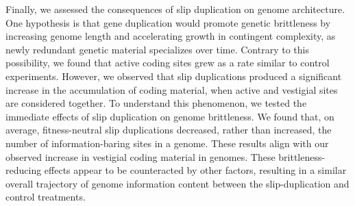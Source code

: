 Finally, we assessed the consequences of slip duplication on genome architecture.
One hypothesis is that gene duplication would promote genetic brittleness by increasing genome length and accelerating growth in contingent complexity, as newly redundant genetic material specializes over time.
Contrary to this possibility, we found that active coding sites grew as a rate similar to control experiments.
However, we observed that slip duplications produced a significant increase in the accumulation of coding material, when active and vestigial sites are considered together.
To understand this phenomenon, we tested the immediate effects of slip duplication on genome brittleness.
We found that, on average, fitness-neutral slip duplications decreased, rather than increased, the number of information-baring sites in a genome.
These results align with our observed increase in vestigial coding material in genomes.
These brittleness-reducing effects appear to be counteracted by other factors, resulting in a similar overall trajectory of genome information content between the slip-duplication and control treatments.
